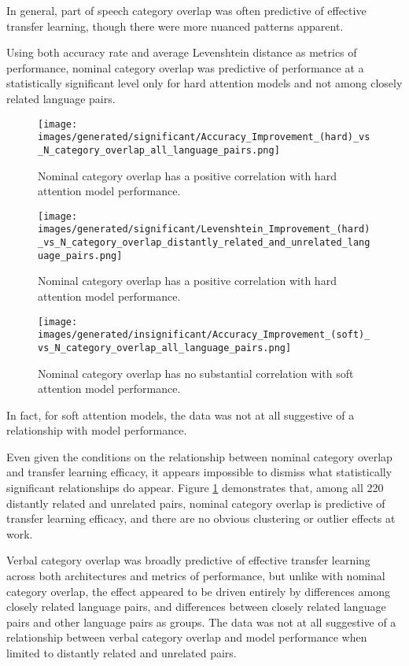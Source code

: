 In general, part of speech category overlap was often predictive of effective transfer learning, though there were more nuanced patterns apparent. 

Using both accuracy rate and average Levenshtein distance as metrics of performance, nominal category overlap was predictive of performance at a statistically significant level only for hard attention models and not among closely related language pairs.

\begin{figure}[ht]
\texttt{[image: images/generated/significant/Accuracy\_Improvement\_(hard)\_vs\_N\_category\_overlap\_all\_language\_pairs.png]}
\centering
\caption{Nominal category overlap has a positive correlation with hard attention model performance.}
\end{figure}

\begin{figure}[ht]
\texttt{[image: images/generated/significant/Levenshtein\_Improvement\_(hard)\_vs\_N\_category\_overlap\_distantly\_related\_and\_unrelated\_language\_pairs.png]}
\centering
\caption{Nominal category overlap has a positive correlation with hard attention model performance.}
\label{fig:LIhNd}
\end{figure}


\begin{figure}[ht]
\texttt{[image: images/generated/insignificant/Accuracy\_Improvement\_(soft)\_vs\_N\_category\_overlap\_all\_language\_pairs.png]}
\centering
\caption{Nominal category overlap has no substantial correlation with soft attention model performance.}
\end{figure}

In fact, for soft attention models, the data was not at all suggestive of a relationship with model performance.

Even given the conditions on the relationship between nominal category overlap and transfer learning efficacy, it appears impossible to dismiss what statistically significant relationships do appear. Figure \ref{fig:LIhNd} demonstrates that, among all 220 distantly related and unrelated pairs, nominal category overlap is predictive of transfer learning efficacy, and there are no obvious clustering or outlier effects at work. 

Verbal category overlap was broadly predictive of effective transfer learning across both architectures and metrics of performance, but unlike with nominal category overlap, the effect appeared to be driven entirely by differences among closely related language pairs, and differences between closely related language pairs and other language pairs as groups. The data was not at all suggestive of a relationship between verbal category overlap and model performance when limited to distantly related and unrelated pairs.

